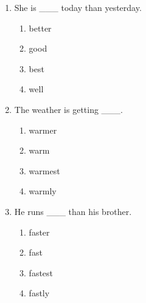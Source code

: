 \documentclass[11pt,a4paper]{ctexart}
\begin{document}
\begin{enumerate}[leftmargin=*,itemsep=4pt]
\begin{enumerate}[label=\Alph*.,leftmargin=2em,itemsep=1pt,topsep=2pt]
\item interestinger
\end{enumerate}
\item She is \_\_\_ today than yesterday.
\begin{enumerate}[label=\Alph*.,leftmargin=2em,itemsep=1pt,topsep=2pt]
\item better
\item good
\item best
\item well
\end{enumerate}
\item The weather is getting \_\_\_.
\begin{enumerate}[label=\Alph*.,leftmargin=2em,itemsep=1pt,topsep=2pt]
\item warmer
\item warm
\item warmest
\item warmly
\end{enumerate}
\item He runs \_\_\_ than his brother.
\begin{enumerate}[label=\Alph*.,leftmargin=2em,itemsep=1pt,topsep=2pt]
\item faster
\item fast
\item fastest
\item fastly
\end{enumerate}
\end{enumerate}
\end{document}
